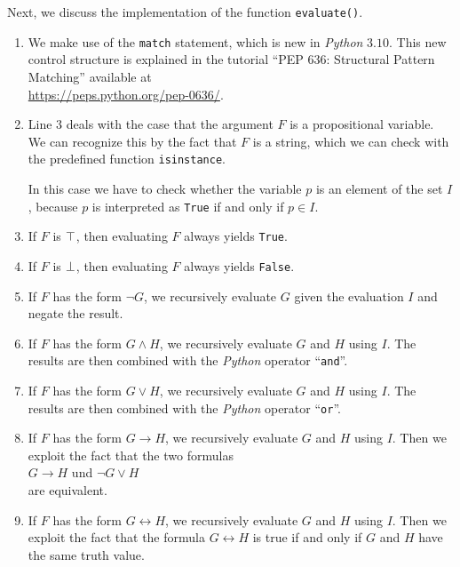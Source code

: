 \noindent
Next, we discuss the implementation of the function \texttt{evaluate()}.
\begin{enumerate}
\item We make use of the \texttt{match} statement, which is new in \textsl{Python} $3.10$.
      This new control structure is explained in the tutorial ``PEP 636: Structural Pattern Matching''
      available at
      \\[0.2cm]
      \hspace*{1.3cm}
      \href{https://peps.python.org/pep-0636/}{https://peps.python.org/pep-0636/}.
\item Line 3 deals with the case that the argument $F$ is a propositional variable.  We can recognize this by
      the fact that $F$ is a string, which we can check with the predefined function
      \texttt{isinstance}.

      In this case we have to check whether the variable $p$ is an element of the set $I$, because $p$ is
      interpreted as \texttt{True} if and only if $p \in I$.
\item If $F$ is $\top$, then evaluating $F$ always yields \texttt{True}.
\item If $F$ is $\bot$, then evaluating $F$ always yields \texttt{False}. 
\item If $F$ has the form $\neg G$, we recursively evaluate $G$ given the evaluation $I$ and negate the result.
\item If $F$ has the form $G \wedge H$, we recursively evaluate
      $G$ and $H$ using $I$.  The results are then combined with the \textsl{Python} operator
      ``\texttt{and}''.
\item If $F$ has the form $G \vee H$, we recursively evaluate
      $G$ and $H$ using $I$.  The results are then combined with the \textsl{Python} operator
      ``\texttt{or}''.
\item If $F$ has the form $G \rightarrow H$, we recursively evaluate
      $G$ and $H$ using $I$.  Then we exploit the fact that the two formulas    
      \\[0.2cm]
      \hspace*{1.3cm}
      $G \rightarrow H$ \quad und \quad $\neg G \vee H$
      \\[0.2cm]
      are equivalent.
\item If $F$ has the form $G \leftrightarrow H$, we recursively evaluate
      $G$ and $H$ using $I$.  Then we exploit the fact that the formula $G \leftrightarrow H$ is true if and
      only if $G$ and $H$ have the same truth value.
\end{enumerate}

